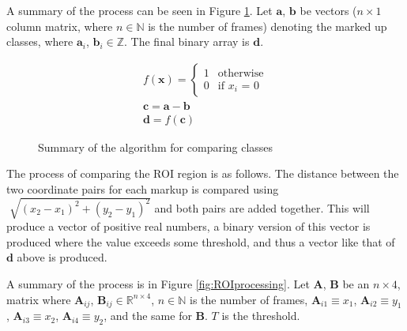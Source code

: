     A summary of the process can be seen in Figure \ref{fig:classprocessing}. Let $\pmb{a}$, $\pmb{b}$ be vectors ($n \times 1$ column matrix, where $n \in \mathbb{N}$ is the number of frames) denoting the marked up classes, where $\pmb{a}_i$, $\pmb{b}_i \in \mathbb{Z}$. The final binary array is $\pmb{d}$.
    \begin{figure}[h]
        \centering
        \begin{gather*}
            f(\pmb{x})=
        \begin{cases}%
        1      & \text{otherwise}\\
        0      & \text{if $x_i$ = 0}
        \end{cases} \\
        \pmb{c}=\pmb{a}-\pmb{b} \\
        \pmb{d}=f(\pmb{c})
        \end{gather*}
        \caption{Summary of the algorithm for comparing classes}
        \label{fig:classprocessing}
    \end{figure}

    The process of comparing the ROI region is as follows. The distance between the two coordinate pairs for each markup is compared using $\sqrt[]{{(x_2-x_1)}^2+{(y_2-y_1)}^2}$ and both pairs are added together. This will produce a vector of positive real numbers, a binary version of this vector is produced where the value exceeds some threshold, and thus a vector like that of $\pmb{d}$ above is produced.

    A summary of the process is in Figure \ref{fig:ROIprocessing}. Let $\pmb{A}$, $\pmb{B}$ be an $n \times 4$, matrix where $\pmb{A}_{ij}$, $\pmb{B}_{ij} \in \mathbb{R}^{n \times 4}$, $n \in \mathbb{N}$ is the number of frames, ${\pmb{A}}_{i1} \equiv x_1$, ${\pmb{A}}_{i2} \equiv y_1$, ${\pmb{A}}_{i3} \equiv x_2$, ${\pmb{A}}_{i4} \equiv y_2$, and the same for $\pmb{B}$. $T$ is the threshold.

